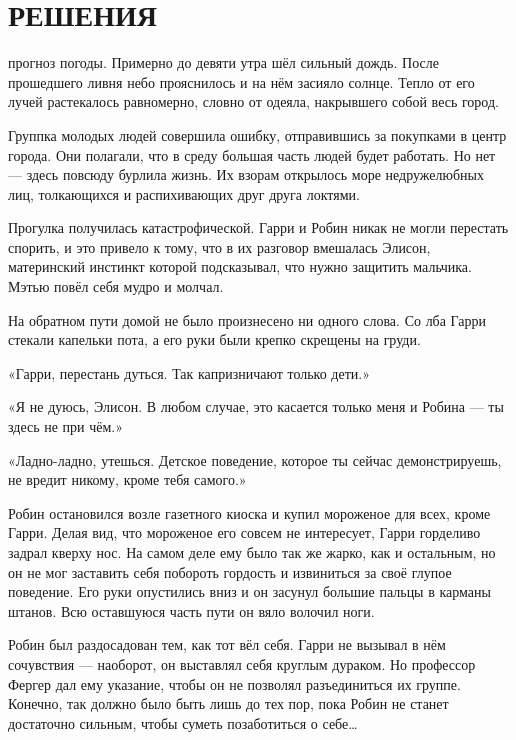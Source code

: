 \documentclass[a4paper,12pt]{book}
\begin{document}
\chapter{РЕШЕНИЯ}
\noindent{} прогноз погоды. Примерно до девяти утра шёл сильный дождь. После прошедшего ливня небо прояснилось и на нём засияло солнце. Тепло от его лучей растекалось равномерно, словно от одеяла, накрывшего собой весь город.
\par
Группка молодых людей совершила ошибку, отправившись за покупками в центр города. Они полагали, что в среду большая часть людей будет работать. Но нет — здесь повсюду бурлила жизнь. Их взорам открылось море недружелюбных лиц, толкающихся и распихивающих друг друга локтями.\\
\par
Прогулка получилась катастрофической. Гарри и Робин никак не могли перестать спорить, и это привело к тому, что в их разговор вмешалась Элисон, материнский инстинкт которой подсказывал, что нужно защитить мальчика. Мэтью повёл себя мудро и молчал.
\par
На обратном пути домой не было произнесено ни одного слова. Со лба Гарри стекали капельки пота, а его руки были крепко скрещены на груди.
\par
«Гарри, перестань дуться. Так капризничают только дети.»
\par
«Я не дуюсь, Элисон. В любом случае, это касается только меня и Робина — ты здесь не при чём.»
\par
«Ладно-ладно, утешься. Детское поведение, которое ты сейчас демонстрируешь, не вредит никому, кроме тебя самого.»
\par
Робин остановился возле газетного киоска и купил мороженое для всех, кроме Гарри. Делая вид, что мороженое его совсем не интересует, Гарри горделиво задрал кверху нос. На самом деле ему было так же жарко, как и остальным, но он не мог заставить себя побороть гордость и извиниться за своё глупое поведение. Его руки опустились вниз и он засунул большие пальцы в карманы штанов. Всю оставшуюся часть пути он вяло волочил ноги.
\par
Робин был раздосадован тем, как тот вёл себя. Гарри не вызывал в нём сочувствия — наоборот, он выставлял себя круглым дураком. Но профессор Фергер дал ему указание, чтобы он не позволял разъединиться их группе. Конечно, так должно было быть лишь до тех пор, пока Робин не станет достаточно сильным, чтобы суметь позаботиться о себе…\\
\end{document}
